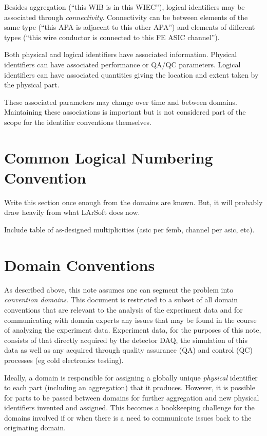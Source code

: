 \documentclass[letterpaper,twoside,onecolumn,report]{memoir}
\begin{document}
Besides aggregation (``this WIB is in this WIEC''), logical
identifiers may be associated through \textit{connectivity}.
Connectivity can be between elements of the same type (``this APA is
adjacent to this other APA'') and elements of different types (``this
wire conductor is connected to this FE ASIC channel'').

Both physical and logical identifiers have associated information.
Physical identifiers can have associated performance or QA/QC
parameters.  Logical identifiers can have associated quantities giving
the location and extent taken by the physical part.

These associated parameters may change over time and between domains.
Maintaining these associations is important but is not considered part
of the scope for the identifier conventions themselves.

\section{Common Logical Numbering Convention}
\label{sec:onering}

Write this section once enough from the domains are known.  But, it
will probably draw heavily from what LArSoft does now.

Include table of as-designed multiplicities (asic per femb, channel per asic, etc).


\section{Domain Conventions}

As described above, this note assumes one can segment the problem into
\textit{convention domains}. 
This document is restricted to a subset of all domain conventions
that are relevant to the analysis of the experiment data and for
communicating with domain experts any issues that may be found in the
course of analyzing the experiment data.  Experiment data, for the
purposes of this note, consists of that directly acquired by the
detector DAQ, the simulation of this data as well as any acquired
through quality assurance (QA) and control (QC) processes (eg cold
electronics testing).

Ideally, a domain is responsible for assigning a globally unique
\textit{physical} identifier to each part (including an aggregation)
that it produces.  However, it is possible for parts to be passed
between domains for further aggregation and new physical identifiers
invented and assigned.  This becomes a bookkeeping challenge for the
domains involved if or when there is a need to communicate issues back
to the originating domain.
\end{document}
